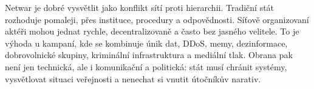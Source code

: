 Netwar je dobré vysvětlit jako konflikt sítí proti hierarchii. Tradiční stát rozhoduje pomaleji, přes instituce, procedury a odpovědnosti. Síťově organizovaní aktéři mohou jednat rychle, decentralizovaně a často bez jasného velitele. To je výhoda u kampaní, kde se kombinuje únik dat, DDoS, memy, dezinformace, dobrovolnické skupiny, kriminální infrastruktura a mediální tlak. Obrana pak není jen technická, ale i komunikační a politická: stát musí chránit systémy, vysvětlovat situaci veřejnosti a nenechat si vnutit útočníkův narativ.


